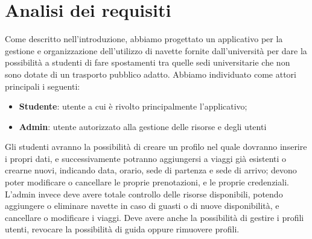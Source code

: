 \section{Analisi dei requisiti}
Come descritto nell'introduzione, abbiamo progettato un applicativo per la gestione e organizzazione dell'utilizzo di navette fornite dall'università per dare la possibilità a studenti di fare spostamenti tra quelle sedi universitarie che non sono dotate di un trasporto pubblico adatto.
Abbiamo individuato come attori principali i seguenti:
\begin{itemize}
    \item \textbf{Studente}: utente a cui è rivolto principalmente l'applicativo; 
    \item \textbf{Admin}:  utente autorizzato alla gestione delle risorse e degli utenti
\end{itemize}
Gli studenti avranno la possibilità di creare un profilo nel quale dovranno inserire i propri dati, e successivamente potranno aggiungersi a viaggi già esistenti o crearne nuovi, indicando data, orario, sede di partenza e sede di arrivo; devono poter modificare o cancellare le proprie prenotazioni, e le proprie credenziali.
\\L'admin invece deve avere totale controllo delle risorse disponibili, potendo aggiungere o eliminare navette in caso di guasti o di nuove disponibilità, e cancellare o modificare i viaggi. Deve avere anche la possibilità di gestire i profili utenti, revocare la possibilità di guida oppure rimuovere profili.
